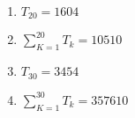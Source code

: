 \begin{enumerate}[label=\thesubsection.\arabic*,ref=\thesubsection.\theenumi]
	\hfill {}
		\begin{multicols}{2}
\begin{enumerate}
\item     $T_{20} =1604$  
\item    $\sum_{K=1}^{20}T_k=10510$
\item     $T_{30}=3454$ 
\item     $\sum_{K=1}^{30}T_k=357610$  
\end{enumerate}
                                         \end{multicols} 
\end{enumerate}
